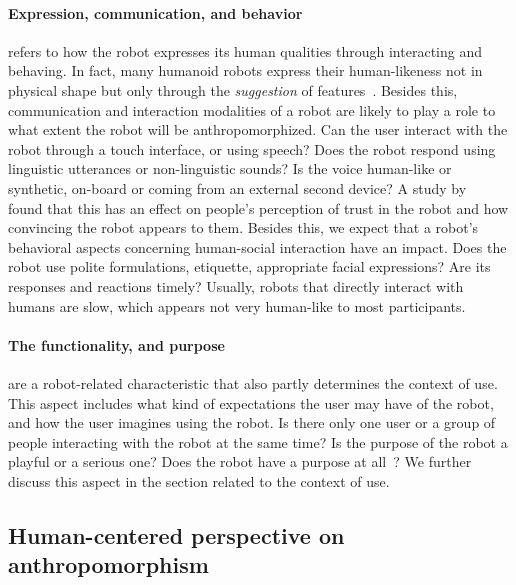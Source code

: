\documentclass{frontiersSCNS} %
\begin{document}
\paragraph{Expression, communication, and behavior} refers to how the robot
expresses its human qualities through interacting and behaving. In fact, many
humanoid robots express their human-likeness not in physical shape but only
through the \textit{suggestion} of features~\citep{disalvo_all_2002}. Besides
this, communication and interaction modalities of a robot are likely to play a
role to what extent the robot will be anthropomorphized. Can the user interact
with the robot through a touch interface, or using speech? Does the robot
respond using linguistic utterances or non-linguistic sounds? Is the voice
human-like or synthetic, on-board or coming from an external second device? A
study by~\cite{takayama_im_2009} found that this has an effect on people's
perception of trust in the robot and how convincing the robot appears to them.
Besides this, we expect that a robot's behavioral aspects concerning
human-social interaction have an impact. Does the robot use polite formulations,
etiquette, appropriate facial expressions? Are its responses and reactions
timely? Usually, robots that directly interact with humans are slow, which
appears not very human-like to most participants. 

\paragraph{The functionality, and purpose} are a robot-related characteristic
that also partly determines the context of use. This aspect includes what kind
of expectations the user may have of the robot, and how the user imagines using
the robot. Is there only one user or a group of people interacting with the
robot at the same time? Is the purpose of the robot a playful or a serious one?
Does the robot have a purpose at all~\citep{kaplan_free_2000}? We further
discuss this aspect in the section related to the context of use.


%
%
%
%
%
%

\subsection{Human-centered perspective on anthropomorphism}
\end{document}
